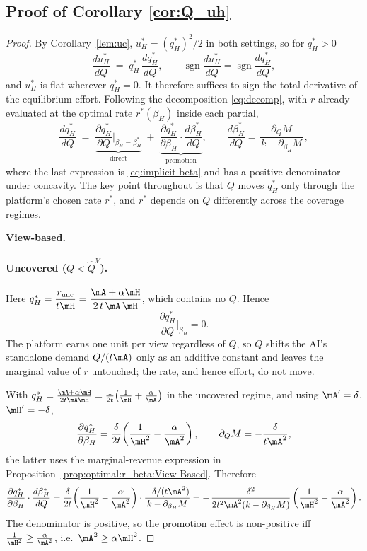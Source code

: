 \subsection*{Proof of Corollary \ref{cor:Q_uh}}
\begin{proof}
By Corollary~\ref{lem:uc}, $u_H^*=(q_H^*)^2/2$ in both settings, so for $q_H^*>0$
\[
    \frac{du_H^*}{dQ} \;=\; q_H^*\,\frac{dq_H^*}{dQ},
    \qquad
    \operatorname{sgn}\!\frac{du_H^*}{dQ}=\operatorname{sgn}\!\frac{dq_H^*}{dQ},
\]
and $u_H^*$ is flat wherever $q_H^*=0$. It therefore suffices to sign the total
derivative of the equilibrium effort. Following the decomposition
\eqref{eq:decomp}, with $r$ already evaluated at the optimal rate $r^*(\beta_H)$
inside each partial,
\[
    \frac{dq_H^*}{dQ}
    \;=\;\underbrace{\frac{\partial q_H^*}{\partial Q}\bigg|_{\beta_H=\beta_H^*}}_{\text{direct}}
    \;+\;\underbrace{\frac{\partial q_H^*}{\partial \beta_H}\cdot\frac{d\beta_H^*}{dQ}}_{\text{promotion}},
    \qquad
    \frac{d\beta_H^*}{dQ}=\frac{\partial_Q M}{\,k-\partial_{\beta_H}M\,},
\]
where the last expression is \eqref{eq:implicit-beta} and has a positive
denominator under concavity. The key point throughout is that $Q$ moves $q_H^*$
only through the platform's chosen rate $r^*$, and $r^*$ depends on $Q$
differently across the coverage regimes.

\medskip
\textbf{View-based.}
\paragraph{Uncovered ($Q<\hat Q^{V}$).} Here $q_H^*=\dfrac{r_{\mathrm{unc}}}{t\mH}=\dfrac{\mA+\alpha\mH}{2\,t\,\mA\,\mH}$,
which contains no $Q$. Hence
\[
    \frac{\partial q_H^*}{\partial Q}\bigg|_{\beta_H}=0.
\]
The platform earns one unit per view regardless of $Q$, so $Q$ shifts the AI's
standalone demand $Q/(t\mA)$ only as an additive constant and leaves the marginal
value of $r$ untouched; the rate, and hence effort, do not move.

With $q_H^*=\frac{\mA+\alpha\mH}{2t\mA\mH}=\frac{1}{2t}\!\left(\frac{1}{\mH}+\frac{\alpha}{\mA}\right)$
in the uncovered regime, and using $\mA'=\delta$, $\mH'=-\delta$,
\[
    \frac{\partial q_H^*}{\partial \beta_H}
    =\frac{\delta}{2t}\!\left(\frac{1}{\mH^{2}}-\frac{\alpha}{\mA^{2}}\right),
    \qquad
    \partial_Q M=-\frac{\delta}{t\mA^{2}},
\]
the latter uses the marginal-revenue expression in
Proposition~\ref{prop:optimal:r_beta:View-Based}. Therefore
\[
    \frac{\partial q_H^*}{\partial \beta_H}\cdot\frac{d\beta_H^*}{dQ}
    =\frac{\delta}{2t}\!\left(\frac{1}{\mH^{2}}-\frac{\alpha}{\mA^{2}}\right)
     \cdot\frac{-\delta/(t\mA^{2})}{\,k-\partial_{\beta_H}M\,}
    =-\,\frac{\delta^{2}}{2t^{2}\mA^{2}(k-\partial_{\beta_H}M)}
        \left(\frac{1}{\mH^{2}}-\frac{\alpha}{\mA^{2}}\right).
\]
The denominator is positive, so the promotion effect is non-positive iff
$\frac{1}{\mH^{2}}\ge\frac{\alpha}{\mA^{2}}$, i.e.\ $\mA^{2}\ge\alpha\mH^{2}$.



\end{proof}
